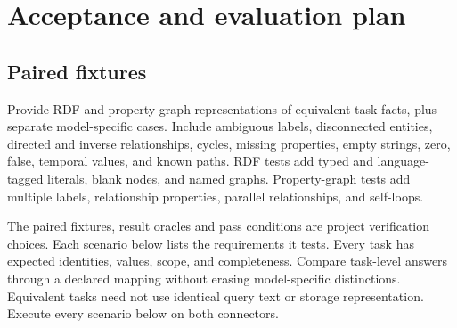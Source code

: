 \documentclass[11pt,a4paper]{article}
\begin{document}
\section{Acceptance and evaluation plan}
\subsection{Paired fixtures}
Provide RDF and property-graph representations of equivalent task facts, plus separate model-specific cases. Include ambiguous labels, disconnected entities, directed and inverse relationships, cycles, missing properties, empty strings, zero, false, temporal values, and known paths. RDF tests add typed and language-tagged literals, blank nodes, and named graphs. Property-graph tests add multiple labels, relationship properties, parallel relationships, and self-loops.

The paired fixtures, result oracles and pass conditions are project verification choices. Each scenario below lists the requirements it tests. Every task has expected identities, values, scope, and completeness. Compare task-level answers through a declared mapping without erasing model-specific distinctions. Equivalent tasks need not use identical query text or storage representation. Execute every scenario below on both connectors.
\end{document}
